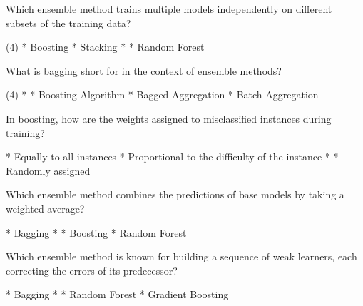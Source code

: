 \documentclass[10pt]{extarticle}
\begin{document}
\begin{exercise}
    Which ensemble method trains multiple models independently on different subsets of the training data?
    \begin{choice}(4)
        * Boosting
        * Stacking
        * 
        * Random Forest
    \end{choice}
\end{exercise}
\begin{solution}
\end{solution}

\begin{exercise}
    What is bagging short for in the context of ensemble methods?

    \begin{choice}(4)
        * 
        * Boosting Algorithm
        * Bagged Aggregation
        * Batch Aggregation
    \end{choice}
\end{exercise}
\begin{solution}
\end{solution}

\begin{exercise}
    In boosting, how are the weights assigned to misclassified instances during training?
    \begin{choice}
        * Equally to all instances
        * Proportional to the difficulty of the instance
        * 
        * Randomly assigned
    \end{choice}
\end{exercise}
\begin{solution}
\end{solution}

\begin{exercise}
    Which ensemble method combines the predictions of base models by taking a weighted average?
    \begin{choice}
        * Bagging
        * 
        * Boosting
        * Random Forest
    \end{choice}
\end{exercise}
\begin{solution}
\end{solution}

\begin{exercise}
    Which ensemble method is known for building a sequence of weak learners, each correcting the errors of its predecessor?
    \begin{choice}
        * Bagging
        * 
        * Random Forest
        * Gradient Boosting
    \end{choice}
\end{exercise}
\begin{solution}
\end{solution}
\end{document}
